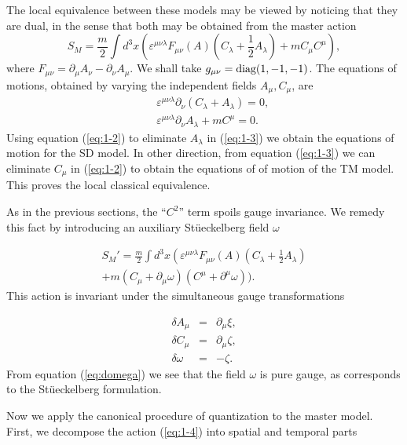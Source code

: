 \documentclass[a4paper,12pt]{article}
\newcommand{\pe}[1]{\int d^3x\left(#1\right)}%
\newcommand{\emn}{\varepsilon^{\mu\nu\lambda}}
\newcommand{\eref}[1]{(\ref{#1})}
\begin{document}
The local equivalence between these models may be viewed by noticing that
they are dual, in the sense that both  may be obtained from the master action
\cite{DJ}
\begin{equation}
   \label{eq:1-1}
   S_M=\frac m{2}\pe{\emn F_{\mu\nu}(A)\left(C_\lambda+
\frac 12A_\lambda\right)+ mC_\mu C^\mu},
\end{equation}
where $F_{\mu\nu}=\partial_{\mu}A_{\nu}-\partial_{\nu}A_{\mu}$. We shall take $g_{\mu\nu}= \hbox{diag}(1, 
-1,-1)$.
The equations of motions, obtained by varying the independent fields
$A_\mu,C_\mu$, are
\begin{eqnarray}
   \label{eq:1-2}
   &&\emn\partial_\nu\left(C_\lambda+A_\lambda\right)=0,\\
   &&\emn \partial_{\nu}A_{\lambda}+ mC^\mu=0\label{eq:1-3}.
\end{eqnarray}
Using equation \eref{eq:1-2} to eliminate $A_\lambda$ in
\eref{eq:1-3} we obtain the equations of motion for the SD model.
In other direction, from equation \eref{eq:1-3} we can eliminate
$C_\mu$ in \eref{eq:1-2} to obtain the equations of of motion of
the TM model. This proves the local classical equivalence.

As in the previous sections, the ``$C^2$'' term spoils gauge invariance.
We remedy this fact by introducing an auxiliary St\"ueckelberg field $\omega$

\begin{eqnarray}
  S_M'=\frac m{2}\int d^3x\left(\emn F_{\mu\nu}(A)\left(C_\lambda+\frac 
12A_\lambda\right)\right.\nonumber\\
+m(C_\mu+\partial_\mu\omega)(C^\mu+\partial^\mu\omega)\Big)\label{eq:1-4}.
\end{eqnarray}
This action is invariant under the simultaneous gauge transformations

\begin{eqnarray}
   \label{eq:1-5}
   \delta A_\mu&=&\partial_\mu\xi,\\
   \delta C_\mu&=&\partial_\mu\zeta,\label{eq:1-6}\\
   \delta\omega&=&-\zeta\label{eq:domega}.
\end{eqnarray}
 From equation (\ref{eq:domega}) we see that the field $\omega$
is  pure gauge, as corresponds to the St\"ueckelberg formulation.

Now we apply the canonical procedure of quantization to the master model.
First, we decompose the action \eref{eq:1-4} into  spatial and temporal parts
\end{document}
